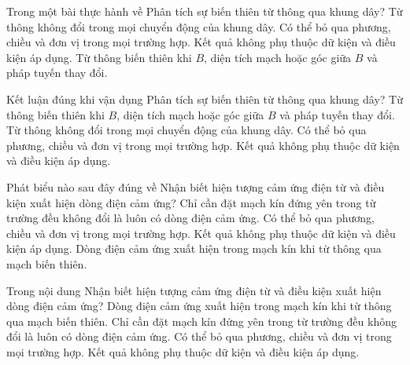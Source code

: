 \begin{ex}
Trong một bài thực hành về Phân tích sự biến thiên từ thông qua khung dây?
\choice
{Từ thông không đổi trong mọi chuyển động của khung dây.}
{Có thể bỏ qua phương, chiều và đơn vị trong mọi trường hợp.}
{Kết quả không phụ thuộc dữ kiện và điều kiện áp dụng.}
{\True Từ thông biến thiên khi $B$, diện tích mạch hoặc góc giữa $B$ và pháp tuyến thay đổi.}
\end{ex}

\begin{ex}
Kết luận đúng khi vận dụng Phân tích sự biến thiên từ thông qua khung dây?
\choice
{\True Từ thông biến thiên khi $B$, diện tích mạch hoặc góc giữa $B$ và pháp tuyến thay đổi.}
{Từ thông không đổi trong mọi chuyển động của khung dây.}
{Có thể bỏ qua phương, chiều và đơn vị trong mọi trường hợp.}
{Kết quả không phụ thuộc dữ kiện và điều kiện áp dụng.}
\end{ex}

\begin{ex}
Phát biểu nào sau đây đúng về Nhận biết hiện tượng cảm ứng điện từ và điều kiện xuất hiện dòng điện cảm ứng?
\choice
{Chỉ cần đặt mạch kín đứng yên trong từ trường đều không đổi là luôn có dòng điện cảm ứng.}
{Có thể bỏ qua phương, chiều và đơn vị trong mọi trường hợp.}
{Kết quả không phụ thuộc dữ kiện và điều kiện áp dụng.}
{\True Dòng điện cảm ứng xuất hiện trong mạch kín khi từ thông qua mạch biến thiên.}
\end{ex}

\begin{ex}
Trong nội dung Nhận biết hiện tượng cảm ứng điện từ và điều kiện xuất hiện dòng điện cảm ứng?
\choice
{\True Dòng điện cảm ứng xuất hiện trong mạch kín khi từ thông qua mạch biến thiên.}
{Chỉ cần đặt mạch kín đứng yên trong từ trường đều không đổi là luôn có dòng điện cảm ứng.}
{Có thể bỏ qua phương, chiều và đơn vị trong mọi trường hợp.}
{Kết quả không phụ thuộc dữ kiện và điều kiện áp dụng.}
\end{ex}

